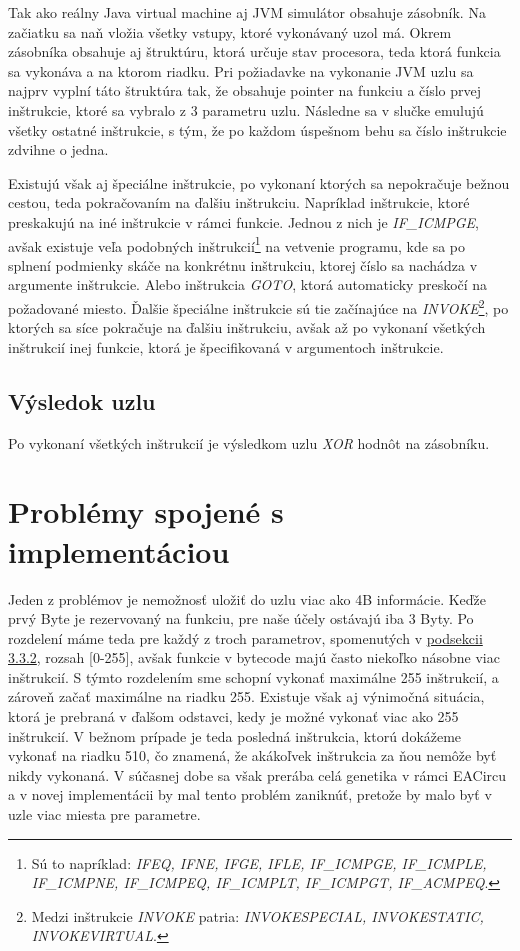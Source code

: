 Tak ako reálny Java virtual machine aj JVM simulátor obsahuje zásobník. Na začiatku sa naň vložia všetky vstupy, ktoré vykonávaný uzol má. Okrem zásobníka obsahuje aj štruktúru, ktorá určuje stav procesora, teda ktorá funkcia sa vykonáva a na ktorom riadku. Pri požiadavke na vykonanie JVM uzlu sa najprv vyplní táto štruktúra tak, že obsahuje pointer na funkciu a číslo prvej inštrukcie, ktoré sa vybralo z 3 parametru uzlu. Následne sa v slučke emulujú všetky ostatné inštrukcie, s tým, že po každom úspešnom behu sa číslo inštrukcie zdvihne o jedna. 

Existujú však aj špeciálne inštrukcie, po vykonaní ktorých sa nepokračuje bežnou cestou, teda pokračovaním na ďalšiu inštrukciu. Napríklad inštrukcie, ktoré preskakujú na iné inštrukcie v rámci funkcie. Jednou z nich je \textit{IF\_ICMPGE}, avšak existuje veľa podobných inštrukcií\footnote{Sú to napríklad: \textit{IFEQ, IFNE, IFGE, IFLE, IF\_ICMPGE, IF\_ICMPLE, IF\_ICMPNE, IF\_ICMPEQ, IF\_ICMPLT, IF\_ICMPGT, IF\_ACMPEQ}.} na vetvenie programu, kde sa po splnení podmienky skáče na konkrétnu inštrukciu, ktorej číslo sa nachádza v argumente inštrukcie. Alebo inštrukcia \textit{GOTO}, ktorá automaticky preskočí na požadované miesto. Ďalšie špeciálne inštrukcie sú tie začínajúce na \textit{INVOKE}\footnote{Medzi inštrukcie \textit{INVOKE} patria: \textit{INVOKESPECIAL, INVOKESTATIC, INVOKEVIRTUAL}.}, po ktorých sa síce pokračuje na ďalšiu inštrukciu, avšak až po vykonaní všetkých inštrukcií inej funkcie, ktorá je špecifikovaná v argumentoch inštrukcie.

\subsection{Výsledok uzlu}

Po vykonaní všetkých inštrukcií je výsledkom uzlu \textit{XOR} hodnôt na zásobníku. 

\section{Problémy spojené s implementáciou}
\label{sec:problems}

Jeden z problémov je nemožnosť uložiť do uzlu viac ako 4B informácie. Keďže prvý Byte je rezervovaný na funkciu, pre naše účely ostávajú iba 3 Byty. Po rozdelení máme teda pre každý z troch parametrov, spomenutých v \hyperref[subsec:jvm-nodes]{podsekcii 3.3.2}, rozsah [0-255], avšak funkcie v bytecode majú často niekoľko násobne viac inštrukcií. S týmto rozdelením sme schopní vykonať maximálne 255 inštrukcií, a zároveň začať maximálne na riadku 255. Existuje však aj výnimočná situácia, ktorá je prebraná v ďalšom odstavci, kedy je možné vykonať viac ako 255 inštrukcií. V bežnom prípade je teda posledná inštrukcia, ktorú dokážeme vykonať na riadku 510, čo znamená, že akákoľvek inštrukcia za ňou nemôže byť nikdy vykonaná. V súčasnej dobe sa však prerába celá genetika v rámci EACircu a v novej implementácii by mal tento problém zaniknúť, pretože by malo byť v uzle viac miesta pre parametre.

